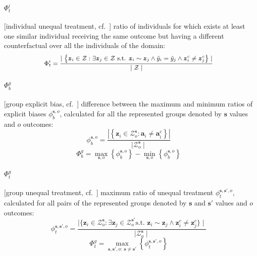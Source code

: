 \documentclass[letterpaper]{article} %
\begin{document}
\paragraph{$\Phi_t^i$} [individual unequal treatment, cf.\ ] ratio of individuals for which exists at least one similar individual receiving the same outcome but having a different counterfactual over all the individuals of the domain:
%
$$\small \Phi_t^i = \frac{ \mid \left\{ \boldsymbol{z}_i \in \mathcal{Z} : \exists \boldsymbol{z}_j \in \mathcal{Z} \text{ s.t. } \boldsymbol{z}_i \sim \boldsymbol{z}_j \wedge \hat{y}_i = \hat{y}_j \wedge \boldsymbol{z}_i^c \neq \boldsymbol{z}_j^c \right\} \mid }{\mid \mathcal{Z} \mid} $$
	
	
\paragraph{$\Phi_b^g$} [group explicit bias, cf.\ ] difference between the maximum and minimum ratios of explicit biases $\phi_b^{\boldsymbol{s},o}$, calculated for all the represented groups denoted by $\boldsymbol{s}$ values and $o$ outcomes:
%
$$\phi_b^{\boldsymbol{s},o} = \frac{ | \left\{ \boldsymbol{z}_i \in \mathcal{Z}^{\boldsymbol{s}}_o : \boldsymbol{a}_{i} \neq \boldsymbol{a}_{i}^{c} \right\} | }{\mid \mathcal{Z}^{\boldsymbol{s}}_o \mid}$$
%
$$\Phi_b^g = \underset{\boldsymbol{s},o}{\max} \left\{ \phi_b^{\boldsymbol{s},o} \right\} - \underset{\boldsymbol{s},o}{\min} \left\{ \phi_b^{\boldsymbol{s},o} \right\} $$
	
\paragraph{$\Phi_t^g$} [group unequal treatment, cf.\ ] maximum ratio of unequal treatment $\phi_t^{\boldsymbol{s}, \boldsymbol{s}',o}$, calculated for all pairs of the represented groups denoted by $\boldsymbol{s}$ and $\boldsymbol{s}'$ values and $o$ outcomes:
%
$$\phi_t^{\boldsymbol{s}, \boldsymbol{s}', o} = \frac{\mid \{ \boldsymbol{z}_i \in \mathcal{Z}^{\boldsymbol{s}}_o : \exists \boldsymbol{z}_j \in \mathcal{Z}^{\boldsymbol{s}'}_o\text{s.t. } \boldsymbol{z}_i \sim \boldsymbol{z}_j \wedge \boldsymbol{z}_i^c \neq \boldsymbol{z}_j^c \} \mid}{\mid \mathcal{Z}^{\boldsymbol{s}}_o \mid}$$
%
$$\Phi_t^g = \underset{\boldsymbol{s}, \boldsymbol{s}', o : ~ \boldsymbol{s} \neq \boldsymbol{s}'}{\max} \left\{ \phi_t^{\boldsymbol{s}, \boldsymbol{s}', o} \right\}$$
\end{document}
